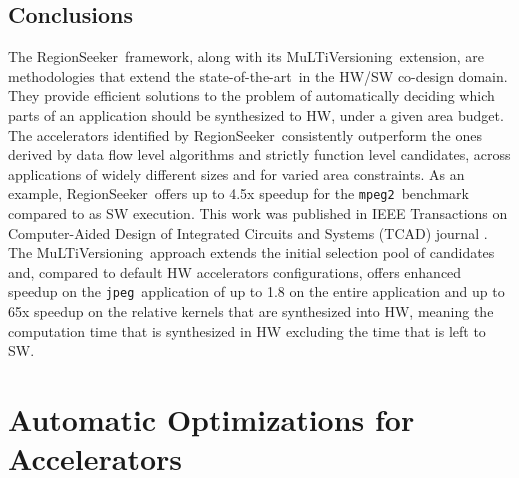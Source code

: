 \documentclass[]{usiinfthesis}
\newcommand{\rseeker}{{RegionSeeker}}
\newcommand{\multi}{MuLTiVersioning}
\newcommand{\SoTA}{{state-of-the-art}}
\newcommand{\jpeg}{\texttt{jpeg}}
\newcommand{\mpeg}{\texttt{mpeg2}}
\begin{document}
\section{Conclusions}
\label{sec:rs_conclusions}

The \rseeker\ framework, along with its %
\multi\ extension, are methodologies that extend the \SoTA\ in the HW/SW co-design domain. They provide
efficient solutions to the problem of automatically deciding which parts of an application should
be synthesized to HW, under a given area budget. The accelerators identified by \rseeker\ 
consistently outperform the ones derived by data flow level algorithms and strictly function 
level candidates, across applications of widely different sizes and for varied area constraints.
As an example, \rseeker\ offers up to 4.5x speedup for the \mpeg\ benchmark compared to as SW
execution. This work was published in IEEE Transactions on Computer-Aided Design of Integrated 
Circuits and Systems (TCAD) journal \cite{ZacharopoulosApr19}.
The \multi\ approach extends the initial selection pool of candidates and, compared
to default HW accelerators configurations, offers enhanced speedup on the \jpeg\ application of up
to 1.8 on the entire application and up to 65x speedup on the relative kernels that 
are synthesized into HW, meaning the computation time that is synthesized in HW excluding the time 
that is left to SW.





%
%
%
%
%  
%
%
%
%
%

\chapter{Automatic Optimizations for Accelerators}
\end{document}
